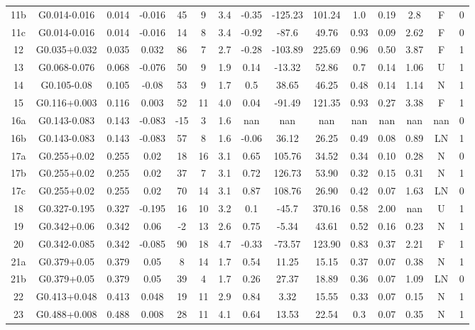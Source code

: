 \begin{table}
\begin{tabular}{ccccccccccccccc}
11b & G0.014-0.016 & 0.014 & -0.016 & 45 & 9 & 3.4 & -0.35 & -125.23 & 101.24 & 1.0 & 0.19 & 2.8 & F & 0 \\
11c & G0.014-0.016 & 0.014 & -0.016 & 14 & 8 & 3.4 & -0.92 & -87.6 & 49.76 & 0.93 & 0.09 & 2.62 & F & 0 \\
12 & G0.035+0.032 & 0.035 & 0.032 & 86 & 7 & 2.7 & -0.28 & -103.89 & 225.69 & 0.96 & 0.50 & 3.87 & F & 1 \\
13 & G0.068-0.076 & 0.068 & -0.076 & 50 & 9 & 1.9 & 0.14 & -13.32 & 52.86 & 0.7 & 0.14 & 1.06 & U & 1 \\
14 & G0.105-0.08 & 0.105 & -0.08 & 53 & 9 & 1.7 & 0.5 & 38.65 & 46.25 & 0.48 & 0.14 & 1.14 & N & 1 \\
15 & G0.116+0.003 & 0.116 & 0.003 & 52 & 11 & 4.0 & 0.04 & -91.49 & 121.35 & 0.93 & 0.27 & 3.38 & F & 1 \\
16a & G0.143-0.083 & 0.143 & -0.083 & -15 & 3 & 1.6 & nan & nan & nan & nan & nan & nan & nan & 0 \\
16b & G0.143-0.083 & 0.143 & -0.083 & 57 & 8 & 1.6 & -0.06 & 36.12 & 26.25 & 0.49 & 0.08 & 0.89 & LN & 1 \\
17a & G0.255+0.02 & 0.255 & 0.02 & 18 & 16 & 3.1 & 0.65 & 105.76 & 34.52 & 0.34 & 0.10 & 0.28 & N & 0 \\
17b & G0.255+0.02 & 0.255 & 0.02 & 37 & 7 & 3.1 & 0.72 & 126.73 & 53.90 & 0.32 & 0.15 & 0.31 & N & 1 \\
17c & G0.255+0.02 & 0.255 & 0.02 & 70 & 14 & 3.1 & 0.87 & 108.76 & 26.90 & 0.42 & 0.07 & 1.63 & LN & 0 \\
18 & G0.327-0.195 & 0.327 & -0.195 & 16 & 10 & 3.2 & 0.1 & -45.7 & 370.16 & 0.58 & 2.00 & nan & U & 1 \\
19 & G0.342+0.06 & 0.342 & 0.06 & -2 & 13 & 2.6 & 0.75 & -5.34 & 43.61 & 0.52 & 0.16 & 0.23 & N & 1 \\
20 & G0.342-0.085 & 0.342 & -0.085 & 90 & 18 & 4.7 & -0.33 & -73.57 & 123.90 & 0.83 & 0.37 & 2.21 & F & 1 \\
21a & G0.379+0.05 & 0.379 & 0.05 & 8 & 14 & 1.7 & 0.54 & 11.25 & 15.15 & 0.37 & 0.07 & 0.38 & N & 1 \\
21b & G0.379+0.05 & 0.379 & 0.05 & 39 & 4 & 1.7 & 0.26 & 27.37 & 18.89 & 0.36 & 0.07 & 1.09 & LN & 0 \\
22 & G0.413+0.048 & 0.413 & 0.048 & 19 & 11 & 2.9 & 0.84 & 3.32 & 15.55 & 0.33 & 0.07 & 0.15 & N & 1 \\
23 & G0.488+0.008 & 0.488 & 0.008 & 28 & 11 & 4.1 & 0.64 & 13.53 & 22.54 & 0.3 & 0.07 & 0.35 & N & 1 \\

\end{tabular}
\end{table}
